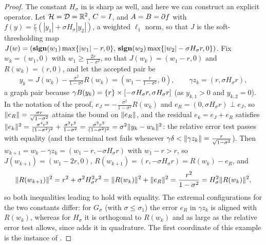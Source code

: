 \documentclass[11pt]{article}
\begin{document}
\begin{proof}
    The constant $H_\sigma$ in  is sharp as well, and here we can construct an explicit operator.
    Let $\mathcal{H} = \mathcal{D} = \mathbb{R}^2$, ${C} = I$, and ${A} = {B} = \partial f$ with $f(y) = \frac{r}{\gamma}\left(|y_1| + \sigma H_\sigma|y_2|\right)$, a weighted $\ell_1$ norm, so that $J$ is the soft-thresholding map $J(w) = \left(\mathop{\bf sign}(w_1)\max\{|w_1| - r, 0\},\, \mathop{\bf sign}(w_2)\max\{|w_2| - \sigma H_\sigma r, 0\}\right)$.
    Fix $w_k = (w_1, 0)$ with $w_1\geq\frac{2r}{1-\sigma^2}$, so that $J(w_k) = (w_1 - r, 0)$ and $R(w_k) = (r, 0)$, and let the accepted pair be
    \begin{align}
        y_k = J(w_k) - \frac{\sigma^2}{1-\sigma^2}R(w_k) = \left(w_1 - \frac{r}{1-\sigma^2},\, 0\right), \qquad \gamma z_k = (r, \sigma H_\sigma r),
    \end{align}
    a graph pair because $\gamma{B}(y_k) = \{r\}\times[-\sigma H_\sigma r, \sigma H_\sigma r]$ (as $y_{k,1}>0$ and $y_{k,2} = 0$).
    In the notation of the proof, $e_J = -\frac{\sigma^2}{1-\sigma^2}R(w_k)$ and $e_R = (0, \sigma H_\sigma r)\perp e_J$, so $\lVert e_R\rVert = \frac{\sigma r}{\sqrt{1-\sigma^2}}$ attains the bound on $\lVert e_R\rVert$, and the residual $e_k = e_J + e_R$ satisfies $\lVert e_k\rVert^2 = \frac{\sigma^4r^2}{(1-\sigma^2)^2} + \frac{\sigma^2r^2}{1-\sigma^2} = \frac{\sigma^2r^2}{(1-\sigma^2)^2} = \sigma^2\lVert y_k - w_k\rVert^2$: the relative error test passes with equality (and the terminal test fails whenever $\gamma\delta<\lVert\gamma z_k\rVert = \frac{r}{\sqrt{1-\sigma^2}}$).
    Then $w_{k+1} = w_k - \gamma z_k = (w_1 - r, -\sigma H_\sigma r)$ with $w_1 - r>r$, so $J(w_{k+1}) = (w_1 - 2r, 0)$, $R(w_{k+1}) = (r, -\sigma H_\sigma r) = R(w_k) - e_R$, and
    \begin{align}
        \lVert R(w_{k+1})\rVert^2 = r^2 + \sigma^2H_\sigma^2r^2 = \lVert R(w_k)\rVert^2 + \lVert e_R\rVert^2 = \frac{r^2}{1-\sigma^2} = H_\sigma^2\lVert R(w_k)\rVert^2,
    \end{align}
    so both inequalities leading to  hold with equality.
    The extremal configurations for the two constants differ: for $G_\sigma$ (with $\sigma\leq\sigma_1$) the error $e_R$ in $\gamma z_k$ is aligned with $R(w_k)$, whereas for $H_\sigma$ it is orthogonal to $R(w_k)$ and as large as the relative error test allows, since  adds it in quadrature.
    The first coordinate of this example is the instance of .
\end{proof}
\end{document}
